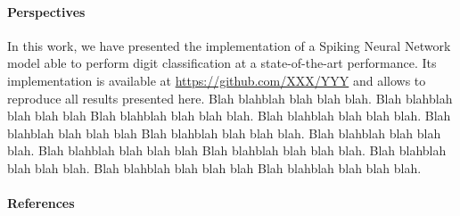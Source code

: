 \documentclass[12pt]{article}
\begin{document}
\paragraph*{Perspectives}
In this work, we have presented the implementation of a Spiking Neural Network model able to perform digit classification at a state-of-the-art performance. Its implementation is available at \url{https://github.com/XXX/YYY} and allows to reproduce all results presented here. %
Blah blahblah blah blah blah. Blah blahblah blah blah blah Blah blahblah blah blah blah.
Blah blahblah blah blah blah. Blah blahblah blah blah blah Blah blahblah blah blah blah.
Blah blahblah blah blah blah. Blah blahblah blah blah blah Blah blahblah blah blah blah.
Blah blahblah blah blah blah. Blah blahblah blah blah blah Blah blahblah blah blah blah.
%
\paragraph*{References}
{
\small
\printbibliography[heading=none]
}


\end{document}
